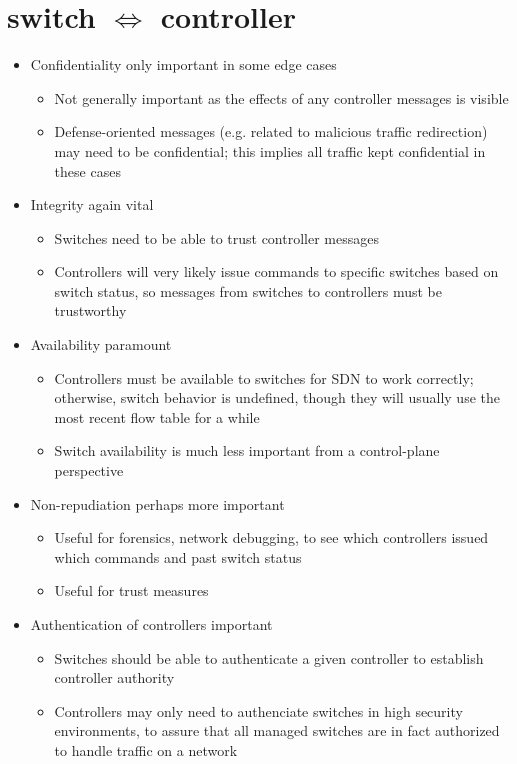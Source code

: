 \documentclass[12pt,letterpaper]{article}
\begin{document}
\section{switch $\Longleftrightarrow$ controller}
\begin{itemize}
\item {\color{orange} Confidentiality only important in some edge cases}
	\begin{itemize}
	\item Not generally important as the effects of any controller messages is visible
	\item Defense-oriented messages (e.g. related to malicious traffic redirection) may need to be confidential; this implies all traffic kept confidential in these cases
	\end{itemize}
\item {\color{red} Integrity again vital}
	\begin{itemize}
	\item Switches need to be able to trust controller messages
	\item Controllers will very likely issue commands to specific switches based on switch status, so messages from switches to controllers must be trustworthy
	\end{itemize}
\item {\color{red} Availability paramount} 
	\begin{itemize}
	\item Controllers must be available to switches for SDN to work correctly; otherwise, switch behavior is undefined, though they will usually use the most recent flow table for a while
	\item Switch availability is much less important from a control-plane perspective
	\end{itemize}
\item {\color{orange} Non-repudiation perhaps more important}
	\begin{itemize}
	\item Useful for forensics, network debugging, to see which controllers issued which commands and past switch status
	\item Useful for trust measures
	\end{itemize}
\item {\color{red} Authentication of controllers important}
	\begin{itemize}
	\item Switches should be able to authenticate a given controller to establish controller authority
	\item Controllers may only need to authenciate switches in high security environments, to assure that all managed switches are in fact authorized to handle traffic on a network
	\end{itemize}
\end{itemize}
\end{document}
